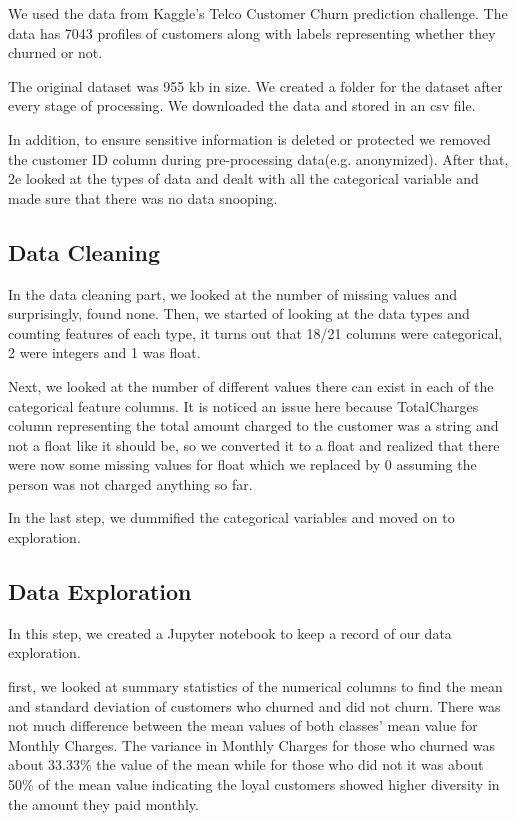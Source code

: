 \documentclass[12pt]{article}
\begin{document}
We used the data from Kaggle’s Telco Customer Churn prediction challenge. The data has 7043 profiles of customers along with labels representing whether they churned or not.

The original dataset was 955 kb in size. We created a folder for the dataset after every stage of processing. We downloaded the data and stored in an csv file.

In addition, to ensure sensitive information is deleted or protected we removed the customer ID column during pre-processing data(e.g. anonymized). After that, 2e looked at the types of data and dealt with all the categorical variable and made sure that there was no data snooping.

\subsection{Data Cleaning}
In the data cleaning part, we looked at the number of missing values and surprisingly, found none. Then, we started of looking at the data types and counting features of each type, it
turns out that 18/21 columns were categorical, 2 were integers and 1 was float. 

Next, we looked at the number of different values there can exist in each of the categorical feature columns. It is noticed an issue here because TotalCharges column representing the total amount charged to the customer was a string and not a float like it should be, 
so we converted it to a float and realized that there were now some missing values for float which we replaced by 0 assuming the person was not charged anything so far.

In the last step, we dummified the categorical variables and moved on to exploration.

\subsection{Data Exploration}
In this step, we created a Jupyter notebook to keep a record of our data exploration.

first, we looked at summary statistics of the numerical columns to find the mean and standard deviation of customers who churned and did not churn. There was not much difference between the mean values of both classes’ mean value for Monthly Charges. The variance in Monthly Charges for those who churned was about 33.33\% the value of the mean while for those who did not it was about 50\% of the mean value indicating the loyal customers showed higher diversity in the amount they paid monthly.
\end{document}

